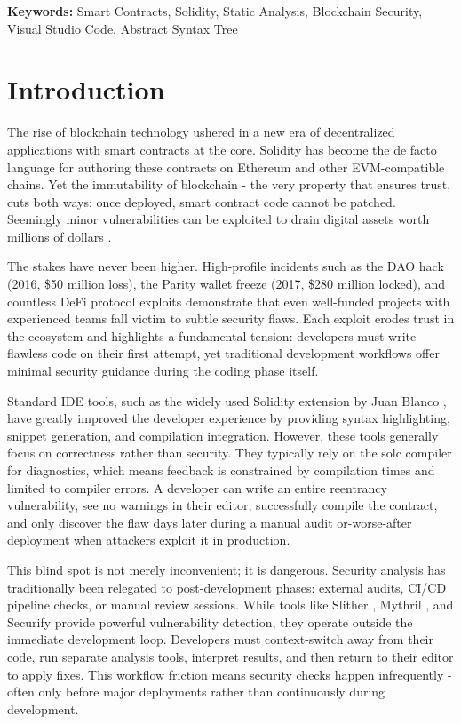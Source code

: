 \documentclass[10pt, a4paper]{article}
\begin{document}
\textbf{Keywords:} Smart Contracts, Solidity, Static Analysis, Blockchain Security, Visual Studio Code, Abstract Syntax Tree

\section{Introduction}

The rise of blockchain technology ushered in a new era of decentralized applications with smart contracts at the core. Solidity has become the de facto language for authoring these contracts on Ethereum and other EVM-compatible chains. Yet the immutability of blockchain - the very property that ensures trust, cuts both ways: once deployed, smart contract code cannot be patched. Seemingly minor vulnerabilities can be exploited to drain digital assets worth millions of dollars \cite{atzei2017}.

The stakes have never been higher. High-profile incidents such as the DAO hack (2016, \$50 million loss), the Parity wallet freeze (2017, \$280 million locked), and countless DeFi protocol exploits demonstrate that even well-funded projects with experienced teams fall victim to subtle security flaws. Each exploit erodes trust in the ecosystem and highlights a fundamental tension: developers must write flawless code on their first attempt, yet traditional development workflows offer minimal security guidance during the coding phase itself.

Standard IDE tools, such as the widely used Solidity extension by Juan Blanco \cite{blanco2016}, have greatly improved the developer experience by providing syntax highlighting, snippet generation, and compilation integration. However, these tools generally focus on correctness rather than security. They typically rely on the solc compiler for diagnostics, which means feedback is constrained by compilation times and limited to compiler errors. A developer can write an entire reentrancy vulnerability, see no warnings in their editor, successfully compile the contract, and only discover the flaw days later during a manual audit or-worse-after deployment when attackers exploit it in production.

This blind spot is not merely inconvenient; it is dangerous. Security analysis has traditionally been relegated to post-development phases: external audits, CI/CD pipeline checks, or manual review sessions. While tools like Slither \cite{feist2019}, Mythril \cite{mueller2018}, and Securify \cite{tsankov2018} provide powerful vulnerability detection, they operate outside the immediate development loop. Developers must context-switch away from their code, run separate analysis tools, interpret results, and then return to their editor to apply fixes. This workflow friction means security checks happen infrequently - often only before major deployments rather than continuously during development.
\end{document}
